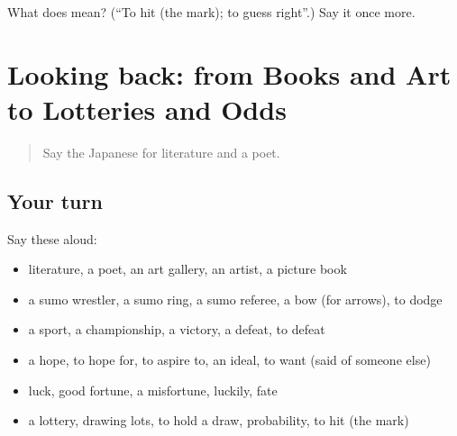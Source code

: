 \begin{tcolorbox}[breakable,colback=teal!4,colframe=teal!35!black,title={Before you move on}]
What does  mean? (\textquotedblleft{}To hit (the mark); to guess right\textquotedblright{}.) Say it once more.
\end{tcolorbox}
\section[(dialogue)]{Looking back: from Books and Art to Lotteries and Odds}

\label{lesson:JA-R509-review-504-509}



\begin{quote}
Say the Japanese for literature and a poet.
\end{quote}

\subsection*{Your turn}
Say these aloud:

\begin{itemize}
\raggedright
  \item literature, a poet, an art gallery, an artist, a picture book
  \item a sumo wrestler, a sumo ring, a sumo referee, a bow (for arrows), to dodge
  \item a sport, a championship, a victory, a defeat, to defeat
  \item a hope, to hope for, to aspire to, an ideal, to want (said of someone else)
  \item luck, good fortune, a misfortune, luckily, fate
  \item a lottery, drawing lots, to hold a draw, probability, to hit (the mark)
\end{itemize}

